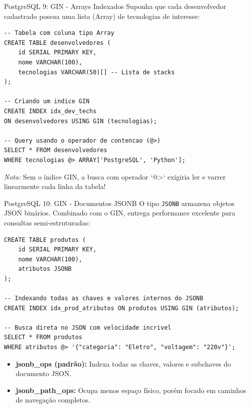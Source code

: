 \documentclass[9pt]{beamer}
\begin{document}
\begin{frame}[fragile]{PostgreSQL 9: GIN - Arrays Indexados}
    Suponha que cada desenvolvedor cadastrado possua uma lista (Array) de tecnologias de interesse:
    
    \vspace{0.2cm}
    \begin{lstlisting}[basicstyle=\ttfamily\scriptsize]
-- Tabela com coluna tipo Array
CREATE TABLE desenvolvedores (
    id SERIAL PRIMARY KEY,
    nome VARCHAR(100),
    tecnologias VARCHAR(50)[] -- Lista de stacks
);

-- Criando um indice GIN
CREATE INDEX idx_dev_techs 
ON desenvolvedores USING GIN (tecnologias);

-- Query usando o operador de contencao (@>)
SELECT * FROM desenvolvedores 
WHERE tecnologias @> ARRAY['PostgreSQL', 'Python'];
    \end{lstlisting}
    
    \vspace{0.1cm}
    \textit{Nota:} Sem o índice GIN, a busca com operador `@>` exigiria ler e varrer linearmente cada linha da tabela!
\end{frame}

\begin{frame}[fragile]{PostgreSQL 10: GIN - Documentos JSONB}
    O tipo \texttt{JSONB} armazena objetos JSON binários. Combinado com o GIN, entrega performance excelente para consultas semi-estruturadas:
    
    \vspace{0.2cm}
    \begin{lstlisting}[basicstyle=\ttfamily\scriptsize]
CREATE TABLE produtos (
    id SERIAL PRIMARY KEY,
    nome VARCHAR(100),
    atributos JSONB
);

-- Indexando todas as chaves e valores internos do JSONB
CREATE INDEX idx_prod_atributos ON produtos USING GIN (atributos);

-- Busca direta no JSON com velocidade incrivel
SELECT * FROM produtos 
WHERE atributos @> '{"categoria": "Eletro", "voltagem": "220v"}';
    \end{lstlisting}
    
    \vspace{0.15cm}
    \begin{itemize}
        \item \textbf{jsonb\_ops (padrão):} Indexa todas as chaves, valores e subchaves do documento JSON.
        \item \textbf{jsonb\_path\_ops:} Ocupa menos espaço físico, porém focado em caminhos de navegação completos.
    \end{itemize}
\end{frame}
\end{document}
